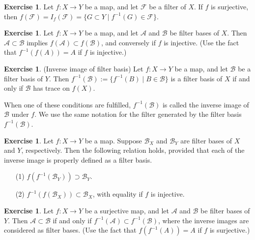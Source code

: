 \documentclass[a4paper,12pt]{article}
\theoremstyle{remark}
\theoremstyle{definition}
\theoremstyle{definition}
\theoremstyle{definition}
\newtheorem{exe}[thm]{Exercise}
\begin{document}
\begin{exe}
	Let \( f:X \to Y \) be a map, and let \( \mathscr{F} \) be a filter of \( X \). If \( f \) is surjective, then \( f(\mathscr{F}) = I_f(\mathscr{F}) = \{G \subset Y \mid f^{-1}(G) \in \mathscr{F}\} \).
\end{exe}

\begin{exe}
	Let \( f:X \to Y \) be a map, and let \( \mathscr{A} \) and \( \mathscr{B} \) be filter bases of \( X \). Then \( \mathscr{A} \subset \mathscr{B} \) implies \( f(\mathscr{A}) \subset f(\mathscr{B}) \), and conversely if \( f \) is injective. (Use the fact that \( f^{-1}(f(A)) =A \) if \( f \) is injective.)
\end{exe}

\begin{exe}\label{inverse image of filter} (Inverse image of filter basis)
	Let \( f:X \to Y \) be a map, and let \( \mathscr{B} \) be a filter basis of \( Y \). Then \( f^{-1}(\mathscr{B}):=\{f^{-1}(B) \mid B \in \mathscr{B}\} \) is a filter basis of \( X \) if and only if \( \mathscr{B} \) has trace on \( f(X) \).

	When one of these conditions are fulfilled, \( f^{-1}(\mathscr{B}) \) is called the inverse image of \( \mathscr{B} \) under \( f \). We  use the same notation for the filter generated by the filter basis \( f^{-1}(\mathscr{B}) \).
\end{exe}

\begin{exe}\label{double mapping}
	Let \( f:X \to Y \) be a map. Suppose \( \mathscr{B}_X \) and \( \mathscr{B}_Y \) are filter bases of \( X \) and \( Y \), respectively.
	Then the following relation holds, provided that each of the inverse image is properly defined as a filter basis.
	\begin{itemize}
		\item[(1)] \( f(f^{-1}(\mathscr{B}_Y)) \supset \mathscr{B}_Y \).
		\item[(2)] \( f^{-1}(f(\mathscr{B}_X)) \subset  \mathscr{B}_X \), with equality if \( f \) is injective.
	\end{itemize}
\end{exe}

\begin{exe}\label{inverse image preserve order}
	Let \( f:X \to Y \) be a surjective map, and let \( \mathscr{A} \) and \( \mathscr{B} \) be filter bases of \( Y \). Then \( \mathscr{A} \subset \mathscr{B} \) if and only if \( f^{-1}(\mathscr{A}) \subset f^{-1}(\mathscr{B}) \), where the inverse images are considered as filter bases. (Use the fact that \( f(f^{-1}(A)) =A \) if \( f \) is surjective.)
\end{exe}
\end{document}
